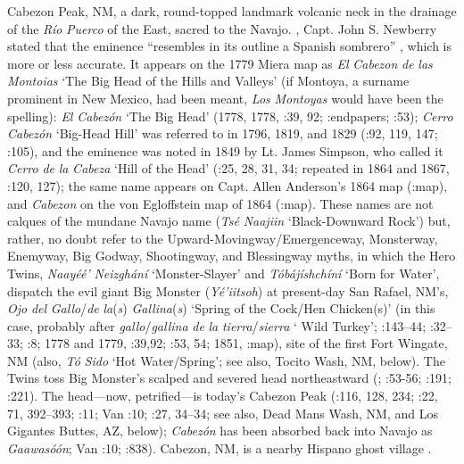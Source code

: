 Cabezon Peak, NM, a dark, round-topped landmark volcanic neck in the drainage of the \textit{Río} \textit{Puerco} of the East, sacred to the Navajo.  \citealt{In1860}, Capt. John S. Newberry stated that the eminence “resembles in its outline a Spanish sombrero” \citep[91]{Madsen2010}, which is more or less accurate.  It appears on the 1779 Miera map as \textit{El} \textit{Cabezon} \textit{de} \textit{las} \textit{Montoias} ‘The Big Head of the Hills and Valleys’ (if Montoya, a surname prominent in New Mexico, had been meant, \textit{Los} \textit{Montoyas} would have been the spelling):  \textit{El} \textit{Cabezón} ‘The Big Head’ (1778, 1778, \citealt{Kessell2013}:39, 92; \citealt{McNitt1972}:endpapers; \citealt{Eidenbach2012}:53); \textit{Cerro} \textit{Cabezón} ‘Big-Head Hill’ was referred to in 1796, 1819, and 1829 (\citealt{Correll1979}:92, 119, 147; \citealt{Reeve1971a}:105), and the eminence was noted in 1849 by Lt. James Simpson, who called it \textit{Cerro} \textit{de} \textit{la} \textit{Cabeza} ‘Hill of the Head’ (\citealt{McNitt1964}:25, 28, 31, 34; repeated in 1864 and 1867, \citealt{Eidenbach2012}:120, 127); the same name appears on Capt. Allen Anderson’s 1864 map (\citealt{Kelly1970}:map), and \textit{Cabezon} on the von Egloffstein map of 1864 (\citealt{Masden2010}:map).  These names are not calques of the mundane Navajo name (\textit{Tsé} \textit{Naajiin} ‘Black-Downward Rock’) but, rather, no doubt refer to the Upward-Movingway/Emergenceway, Monsterway, Enemyway, Big Godway, Shootingway, and Blessingway myths, in which the Hero Twins, \textit{Naayéé’} \textit{Neizghání} ‘Monster-Slayer’ and \textit{Tóbájíshchíní} ‘Born for Water’, dispatch the evil giant Big Monster (\textit{Yé’iitsoh}) at present-day San Rafael, NM’s, \textit{Ojo} \textit{del} \textit{Gallo}/\textit{de} \textit{la}(\textit{s}) \textit{Gallina}(\textit{s}) ‘Spring of the Cock/Hen Chicken(s)’ (in this case, probably after \textit{gallo}/\textit{gallina} \textit{de} \textit{la} \textit{tierra}/\textit{sierra} ‘ Wild Turkey’; \citealt{Julyan1998}:143–44; \citealt{BillsVigil2008}:32–33; \citealt{Studerus2001}:8; 1778 and 1779, \citealt{Kessell2013}:39,92; \citealt{Eidenbach2012}:53, 54; 1851, \citealt{Sitgreaves1962}:map), site of the first Fort Wingate, NM (also, \textit{Tó} \textit{Sido} ‘Hot Water/Spring’; see also, Tocito Wash, NM, below).  The Twins toss Big Monster’s scalped and severed head northeastward (\citealt{Haile1938}; \citealt{Fishler1953}:53-56; \citealt{Haile1981}:191; \citealt{Zolbrod1984}:221).  The head—now, petrified—is today’s Cabezon Peak (\citealt{Matthews1897}:116, 128, 234; \citealt{Reichard1990}:22, 71, 392–393; \citealt{Watson1964}:11; Van \citealt{Valkenburgh1999}:10; \citealt{Holmes1989}:27, 34–34; see also, Dead Mans Wash, NM, and Los Gigantes Buttes, AZ, below); \textit{Cabezón} has been absorbed back into Navajo as \textit{Gaawasóón}; Van \citealt{Valkenburgh1999}:10; \citealt{YoungMorgan1980}:838).  Cabezon, NM, is a nearby Hispano ghost village \citep[180]{Linford2000}.

